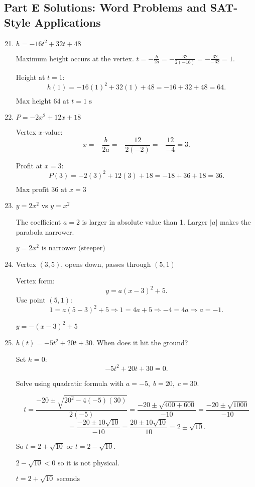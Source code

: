 \documentclass[12pt]{article}
\begin{document}
\subsection*{Part E Solutions: Word Problems and SAT-Style Applications}
\begin{enumerate}
  \setcounter{enumi}{20}
  \item \(h = -16t^2 + 32t + 48\)

  Maximum height occurs at the vertex.  
  \(t = -\frac{b}{2a} = -\frac{32}{2(-16)} = -\frac{32}{-32} = 1.\)

  Height at \(t = 1\):  
  \[
  h(1) = -16(1)^2 + 32(1) + 48 = -16 + 32 + 48 = 64.
  \]

  \(\boxed{\text{Max height } 64 \text{ at } t = 1\text{ s}}\)

  \item \(P = -2x^2 + 12x + 18\)

  Vertex \(x\)-value:  
  \[
  x = -\frac{b}{2a} = -\frac{12}{2(-2)} = -\frac{12}{-4} = 3.
  \]

  Profit at \(x = 3\):  
  \[
  P(3) = -2(3)^2 + 12(3) + 18 = -18 + 36 + 18 = 36.
  \]

  \(\boxed{\text{Max profit } 36 \text{ at } x = 3}\)

  \item \(y = 2x^2\) vs \(y = x^2\)

  The coefficient \(a = 2\) is larger in absolute value than 1.  
  Larger \(|a|\) makes the parabola narrower.

  \(\boxed{y = 2x^2 \text{ is narrower (steeper)}}\)

  \item Vertex \((3, 5)\), opens down, passes through \((5, 1)\)

  Vertex form:
  \[
  y = a(x - 3)^2 + 5.
  \]
  Use point \((5, 1)\):
  \[
  1 = a(5 - 3)^2 + 5 \Rightarrow 1 = 4a + 5 \Rightarrow -4 = 4a \Rightarrow a = -1.
  \]

  \(\boxed{y = -(x - 3)^2 + 5}\)

  \item \(h(t) = -5t^2 + 20t + 30\). When does it hit the ground?

  Set \(h = 0\):
  \[
  -5t^2 + 20t + 30 = 0.
  \]

  Solve using quadratic formula with \(a = -5,\; b = 20,\; c = 30.\)

  \[
  t = \frac{-20 \pm \sqrt{20^2 - 4(-5)(30)}}{2(-5)}
  = \frac{-20 \pm \sqrt{400 + 600}}{-10}
  = \frac{-20 \pm \sqrt{1000}}{-10}
  \]
  \[
  = \frac{-20 \pm 10\sqrt{10}}{-10}
  = \frac{20 \pm 10\sqrt{10}}{10}
  = 2 \pm \sqrt{10}.
  \]

  So \(t = 2 + \sqrt{10}\) or \(t = 2 - \sqrt{10}.\)

  \(2 - \sqrt{10} < 0\) so it is not physical.

  \(\boxed{t = 2 + \sqrt{10} \text{ seconds}}\)
\end{enumerate}
\end{document}
